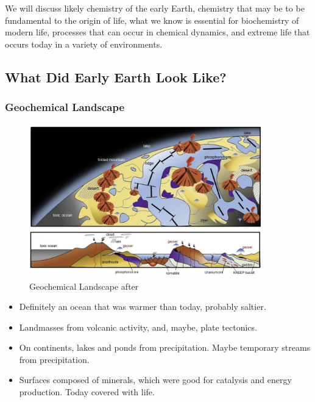 \documentclass[]{article}
\begin{document}
We will discuss likely chemistry of the early Earth, chemistry that may be to be fundamental to the origin of life, what we know is essential for biochemistry of modern life, processes that can occur in chemical dynamics, and extreme life that occurs today in a variety of environments.


\subsection{What Did Early Earth Look Like?}

\subsubsection{Geochemical Landscape}
\begin{figure}[h!]
	\caption{Geochemical Landscape after \cite{kitadai2018origins}}
	\includegraphics[width=0.9\textwidth]{GeochemicalLandscape}
\end{figure}

  
  \begin{itemize}
  	\item  Definitely an ocean that was warmer than today, probably saltier.
  	\item Landmasses from volcanic activity, and, maybe, plate tectonics.
  	\item On continents, lakes and ponds from precipitation.  Maybe temporary streams from precipitation.
  	\item Surfaces composed of minerals, which were good for catalysis and energy production. Today covered with life.
  \end{itemize}
\end{document}
